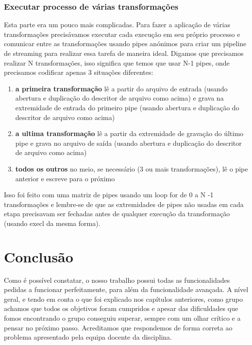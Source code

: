 \documentclass[a4paper]{report}
\begin{document}
    \subsection{Executar processo de várias transformações}
    Esta parte era um pouco mais complicadas. Para fazer a aplicação de várias transformações precisávamos executar cada execução em seu próprio processo e comunicar entre as transformações usando pipes anónimos para criar um pipeline de streaming para realizar essa tarefa de maneira ideal. Digamos que precisamos realizar N transformações, isso significa que temos que usar N-1 pipes, onde precisamos codificar apenas 3 situações diferentes:
    
    \begin{enumerate}
        \item \textbf{a primeira transformação} lê a partir do arquivo de entrada (usando abertura e duplicação do descritor de arquivo como acima) e grava na extremidade de entrada do primeiro pipe (usando abertura e duplicação do descritor de arquivo como acima)
        \item \textbf{a ultima transformação} lê a partir da extremidade de gravação do último pipe e grava no arquivo de saída (usando abertura e duplicação do descritor de arquivo como acima)
        \item \textbf{todos os outros} no meio, se necessário (3 ou mais transformações), lê o pipe anterior e escreve para o próximo

    \end{enumerate}
    Isso foi feito com uma matriz de pipes usando um loop for de 0 a N -1 transformações e lembre-se de que as extremidades de pipes não usadas em cada etapa precisavam ser fechadas antes de qualquer execução da transformação (usando execl da mesma forma).

      
	\chapter{Conclusão}
	
	Como é possível constatar, o nosso trabalho possui todas as funcionalidades pedidas a funcionar perfeitamente, para além da funcionalidade avançada. A nível geral, e tendo em conta o que foi explicado nos capítulos anteriores, como grupo achamos que todos os objetivos foram cumpridos e apesar das dificuldades que fomos encontrando o grupo conseguiu superar, sempre com um olhar crítico e a pensar no próximo passo. Acreditamos que respondemos de forma correta ao problema apresentado pela equipa docente da disciplina.
	
\end{document}
